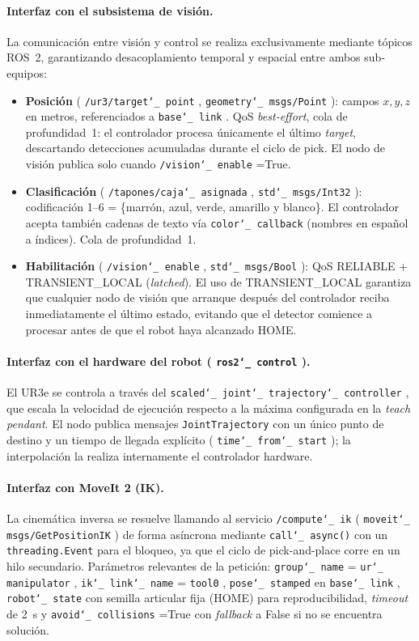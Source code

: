 \documentclass[12pt,a4paper]{article}
\newcommand{\code}[1]{%
  \begingroup
  \def\_{\char`_\penalty0 }%
  \def\/{\char`/\penalty0 }%
  \texttt{\small #1}%
  \endgroup}
\begin{document}
\paragraph{Interfaz con el subsistema de visión.}
La comunicación entre visión y control se realiza exclusivamente mediante tópicos ROS~2, garantizando
desacoplamiento temporal y espacial entre ambos sub-equipos:
\begin{itemize}
  \item \textbf{Posición} (\code{/ur3/target\_point}, \code{geometry\_msgs/Point}): campos $x,y,z$ en
        metros, referenciados a \code{base\_link}. QoS \textit{best-effort}, cola de profundidad~1: el
        controlador procesa únicamente el último \textit{target}, descartando detecciones acumuladas
        durante el ciclo de pick. El nodo de visión publica solo cuando \code{/vision\_enable}=True.
  \vspace{6.5pt}
  \item \textbf{Clasificación} (\code{/tapones/caja\_asignada}, \code{std\_msgs/Int32}): codificación
        1--6 = \{marrón, azul, verde, amarillo y blanco\}. El controlador acepta también cadenas de
        texto vía \code{color\_callback} (nombres en español a índices). Cola de profundidad~1.
  \clearpage      
  \item \textbf{Habilitación} (\code{/vision\_enable}, \code{std\_msgs/Bool}): QoS RELIABLE +
        TRANSIENT\_LOCAL (\textit{latched}). El uso de TRANSIENT\_LOCAL garantiza que cualquier nodo de
        visión que arranque después del controlador reciba inmediatamente el último estado, evitando que
        el detector comience a procesar antes de que el robot haya alcanzado HOME.
\end{itemize}

\paragraph{Interfaz con el hardware del robot (\code{ros2\_control}).}
El UR3e se controla a través del \code{scaled\_joint\_trajectory\_controller}, que escala la velocidad de
ejecución respecto a la máxima configurada en la \textit{teach pendant}. El nodo publica mensajes
\code{JointTrajectory} con un único punto de destino y un tiempo de llegada explícito
(\code{time\_from\_start}); la interpolación la realiza internamente el controlador hardware.

\paragraph{Interfaz con MoveIt 2 (IK).}
La cinemática inversa se resuelve llamando al servicio \code{/compute\_ik}
(\code{moveit\_msgs/GetPositionIK}) de forma asíncrona mediante \code{call\_async()} con un
\code{threading.Event} para el bloqueo, ya que el ciclo de pick-and-place corre en un hilo secundario.
Parámetros relevantes de la petición: \code{group\_name}=\code{ur\_manipulator},
\code{ik\_link\_name}=\code{tool0}, \code{pose\_stamped} en \code{base\_link}, \code{robot\_state}
con semilla articular fija (HOME) para reproducibilidad, \textit{timeout} de 2~s y
\code{avoid\_collisions}=True con \textit{fallback} a False si no se encuentra solución.
\end{document}
